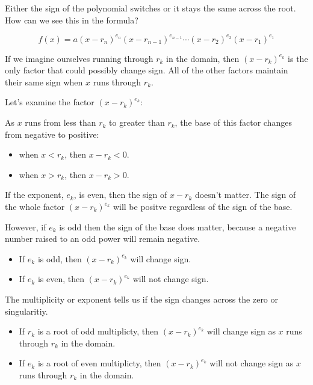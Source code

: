\documentclass{ximera}
\begin{document}
Either the sign of the polynomial switches or it stays the same across the root.  How can we see this in the formula?



\[   f(x) = a (x-r_n)^{e_n} (x-r_{n-1})^{e_{n-1}}  \cdots (x-r_2)^{e_2} (x-r_1)^{e_1}  \]


If we imagine ourselves running through $r_k$ in the domain, then $(x-r_k)^{e_k}$ is the only factor that could possibly change sign.  All of the other factors maintain their same sign when $x$ runs through $r_k$.



Let's examine the factor $(x-r_k)^{e_k}$:

As $x$ runs from less than $r_k$ to greater than $r_k$, the base of this factor changes from negative to positive:

\begin{itemize}
\item when $x<r_k$, then $x-r_k <0$.  \\

\item when $x>r_k$, then $x-r_k >0$. \\
\end{itemize}


If the exponent, $e_k$, is even, then the sign of $x-r_k$ doesn't matter. The sign of the whole factor $(x-r_k)^{e_k}$ will be positve regardless of the sign of the base.

However, if $e_k$ is odd then the sign of the base does matter, because a negative number raised to an odd power will remain negative.





\begin{itemize}
\item If $e_k$ is odd, then $(x-r_k)^{e_k}$ will change sign.
\item If $e_k$ is even, then $(x-r_k)^{e_k}$ will not change sign.
\end{itemize}




The multiplicity or exponent tells us if the sign changes across the zero or singularitiy.


\begin{itemize}
\item If $r_k$ is a root of odd multiplicty, then $(x-r_k)^{e_k}$ will change sign as $x$ runs through $r_k$ in the domain.
\item If $e_k$ is a root of even multiplicty, then $(x-r_k)^{e_k}$ will not change sign as $x$ runs through $r_k$ in the domain.
\end{itemize}
\end{document}
